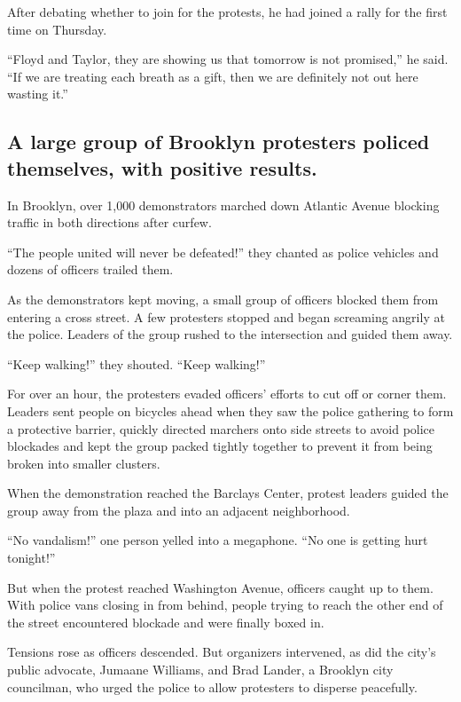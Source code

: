 After debating whether to join for the protests, he had joined a rally
for the first time on Thursday.

``Floyd and Taylor, they are showing us that tomorrow is not promised,''
he said. ``If we are treating each breath as a gift, then we are
definitely not out here wasting it.''

\hypertarget{a-large-group-of-brooklyn-protesters-policed-themselves-with-positive-results}{%
\subsection{A large group of Brooklyn protesters policed themselves,
with positive
results.}\label{a-large-group-of-brooklyn-protesters-policed-themselves-with-positive-results}}

In Brooklyn, over 1,000 demonstrators marched down Atlantic Avenue
blocking traffic in both directions after curfew.

``The people united will never be defeated!'' they chanted as police
vehicles and dozens of officers trailed them.

As the demonstrators kept moving, a small group of officers blocked them
from entering a cross street. A few protesters stopped and began
screaming angrily at the police. Leaders of the group rushed to the
intersection and guided them away.

``Keep walking!'' they shouted. ``Keep walking!''

For over an hour, the protesters evaded officers' efforts to cut off or
corner them. Leaders sent people on bicycles ahead when they saw the
police gathering to form a protective barrier, quickly directed marchers
onto side streets to avoid police blockades and kept the group packed
tightly together to prevent it from being broken into smaller clusters.

When the demonstration reached the Barclays Center, protest leaders
guided the group away from the plaza and into an adjacent neighborhood.

``No vandalism!'' one person yelled into a megaphone. ``No one is
getting hurt tonight!''

But when the protest reached Washington Avenue, officers caught up to
them. With police vans closing in from behind, people trying to reach
the other end of the street encountered blockade and were finally boxed
in.

Tensions rose as officers descended. But organizers intervened, as did
the city's public advocate, Jumaane Williams, and Brad Lander, a
Brooklyn city councilman, who urged the police to allow protesters to
disperse peacefully.


